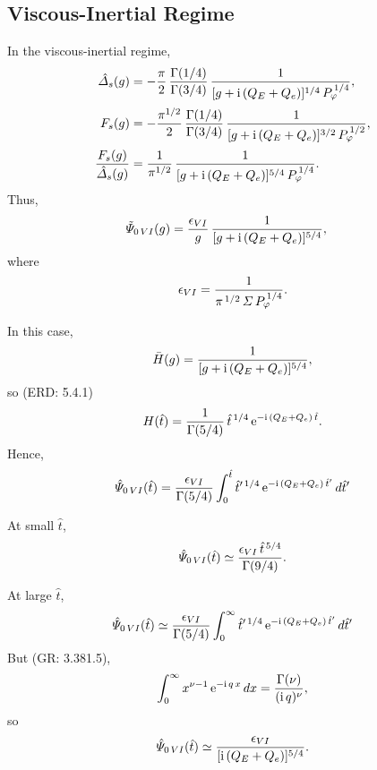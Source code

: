\documentclass[titlepage=false,12pt]{article}
\begin{document}
\subsection{Viscous-Inertial Regime}
In the viscous-inertial regime, 
\begin{align}
\hat{\mit\Delta}_s(g)& = -\frac{\pi}{2}\,\frac{\Gamma(1/4)}{\Gamma(3/4)}\,\frac{1}{[g+{\rm i}\,(Q_E+Q_e)]^{1/4}\,P_\varphi^{\,1/4}},\\[0.5ex]
F_s(g)&=-\frac{\pi^{1/2}}{2}\,\frac{\Gamma(1/4)}{\Gamma(3/4)}\,\frac{1}{[g+{\rm i}\,(Q_E+Q_e)]^{3/2}\,P_\varphi^{\,1/2}},\\[0.5ex]
\frac{F_s(g)}{\hat{\mit\Delta}_s(g)}&= \frac{1}{\pi^{1/2}}\,\frac{1}{[g+{\rm i}\,(Q_E+Q_e)]^{5/4}\,P_\varphi^{\,1/4}}.
\end{align}
Thus,
\begin{align}
\tilde{\mit\Psi}_{0\,VI}(g) &=
\frac{ \epsilon_{VI}}{g}\,\frac{1}{[g+{\rm i}\,(Q_E+Q_e)]^{5/4}},
\end{align}
where
\begin{equation}
\epsilon_{VI} = \frac{1}{\pi^{\,1/2}\,{\mit\Sigma}\,P_\varphi^{\,1/4}}.
\end{equation}

In this case,
\begin{equation}
\bar{H}(g) = \frac{1}{[g+{\rm i}\,(Q_E+Q_e)]^{5/4}},
\end{equation}
so (ERD: 5.4.1)
\begin{equation}
H(\hat{t}) = \frac{1}{\Gamma(5/4)}\,\hat{t}^{\,1/4}\,{\rm e}^{-{\rm i}\,(Q_E+Q_e)\,\hat{t}}.
\end{equation}
Hence,
\begin{equation}
\hat{\mit\Psi}_{0\,VI}(\hat{t}) =\frac{\epsilon_{VI}}{\Gamma(5/4)}\int_0^{\hat{t}}
\hat{t}'^{\,1/4}\,{\rm e}^{-{\rm i}\,(Q_E+Q_e)\,\hat{t}'}\,d\hat{t}'
\end{equation}

At small $\hat{t}$,
\begin{equation}
\hat{\mit\Psi}_{0\,VI}(\hat{t}) \simeq \frac{\epsilon_{VI}\,\hat{t}^{\,5/4}}{\Gamma(9/4)}.
\end{equation}

At large $\hat{t}$, 
\begin{equation}
\hat{\mit\Psi}_{0\,VI}(\hat{t}) \simeq\frac{\epsilon_{VI}}{\Gamma(5/4)}\int_0^\infty
\hat{t}'^{\,1/4}\,{\rm e}^{-{\rm i}\,(Q_E+Q_e)\,\hat{t}'}\,d\hat{t}'
\end{equation}
But (GR: 3.381.5), 
\begin{equation}
\int_0^\infty x^{\nu-1}\,{\rm e}^{-{\rm i}\,q\,x}\,dx = \frac{\Gamma(\nu)}{({\rm i}\,q)^{\nu}},
\end{equation}
so 
\begin{equation}
\hat{\mit\Psi}_{0\,VI}(\hat{t}) \simeq \frac{\epsilon_{VI}}{[{\rm i}\,(Q_E+Q_e)]^{5/4}}.
\end{equation}
\end{document}
